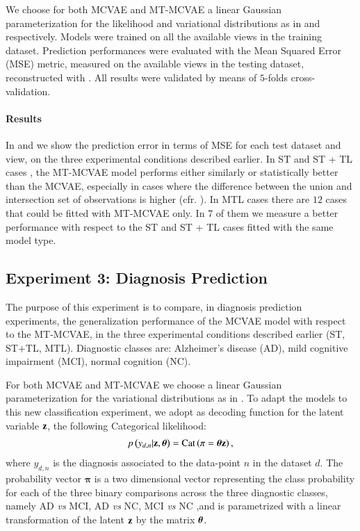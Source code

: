 We choose for both MCVAE and MT-MCVAE a linear Gaussian parameterization for the likelihood and variational distributions as in  and  respectively.
Models were trained on all the available views in the training dataset. %
Prediction performances were evaluated with the Mean Squared Error (MSE) metric, measured on the available views in the testing dataset, reconstructed with .
All results were validated by means of $5$-folds cross-validation.

\paragraph{Results}
In  and  we show the prediction error in terms of MSE for each test dataset and view, on the three experimental conditions described earlier.
In ST and ST + TL cases , the MT-MCVAE model performs either similarly or statistically better than the MCVAE, especially in cases where the difference between the union and intersection set of observations is higher (cfr. ).
In MTL cases  there are $12$ cases that could be fitted with MT-MCVAE only.
In $7$ of them we measure a better performance with respect to the ST and  ST + TL cases fitted with the same model type.

\subsection{Experiment 3: Diagnosis Prediction}


The purpose of this experiment is to compare, in diagnosis prediction experiments, the generalization performance of the MCVAE model with respect to the MT-MCVAE, in the three experimental conditions described earlier (ST, ST+TL, MTL).
Diagnostic classes are:
Alzheimer's disease (AD),
mild cognitive impairment (MCI),
normal cognition (NC).

For both MCVAE and MT-MCVAE we choose a linear Gaussian parameterization for the variational distributions as in .
To adapt the models to this new classification experiment, we adopt as decoding function for the latent variable $\mathbf{z}$, the following Categorical likelihood:
\begin{align}
\label{eq:classifier}
p\left(y_{d,n}|\mathbf{z},\boldsymbol{\theta}\right) = \operatorname{Cat}\left(\mathbf{\pi}=\boldsymbol{\theta}\mathbf{z}\right),
\end{align}
where $y_{d,n}$ is the diagnosis associated to the data-point $n$ in the dataset $d$.
The probability vector $\mathbf{\pi}$ is a two dimensional vector representing the class probability for each of the three binary comparisons across the three diagnostic classes, namely AD \textit{vs} MCI, AD \textit{vs} NC, MCI \textit{vs} NC ,and is parametrized with a linear transformation of the latent $\mathbf{z}$ by the matrix $\boldsymbol{\theta}$.

